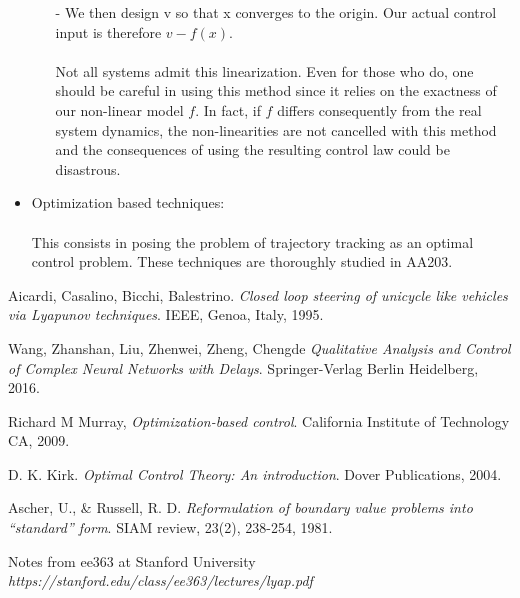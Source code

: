 \documentclass[twoside]{article}
\begin{document}
\begin{itemize}
\begin{enumerate}
     - We then design v so that x converges to the origin. Our actual control input is therefore $v - f(x)$. \\
     \\
     Not all systems admit this linearization. Even for those who do, one should be careful in using this method since it relies on the exactness of our non-linear model $f$. In fact, if $f$ differs consequently from the real system dynamics, the non-linearities are not cancelled with this method and the consequences of using the resulting control law could be disastrous. 
  \end{enumerate}
  \item Optimization based techniques: \\
  \\
  This consists in posing the problem of trajectory tracking as an optimal control problem. These techniques are thoroughly studied in AA203. 
\end{itemize}


\begin{thebibliography}{9}
Aicardi, Casalino, Bicchi, Balestrino. 
\textit{Closed loop steering of unicycle like vehicles via Lyapunov techniques}. 
IEEE, Genoa, Italy, 1995.


Wang, Zhanshan, Liu, Zhenwei, Zheng, Chengde
\textit{Qualitative Analysis and Control of Complex Neural Networks with Delays}. 
Springer-Verlag Berlin Heidelberg,  2016.


Richard M Murray, \textit{Optimization-based control}. California Institute of Technology CA, 2009.

D. K. Kirk. \textit{Optimal Control Theory: An introduction}. Dover Publications, 2004.

Ascher, U., \& Russell, R. D. \textit{Reformulation of boundary value problems into ``standard'' form}. SIAM review, 23(2), 238-254, 1981.

Notes from ee363 at Stanford University
\textit{https://stanford.edu/class/ee363/lectures/lyap.pdf}

\end{thebibliography}
\end{document}
